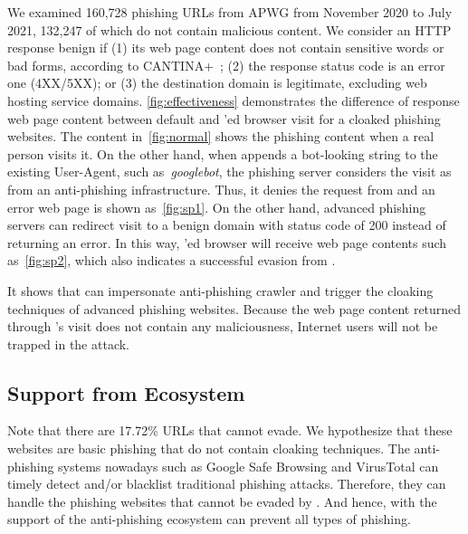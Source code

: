 We examined 160,728 phishing URLs from APWG from November 2020 to July 2021,
132,247 of which do not contain malicious content.
We consider an HTTP response benign if (1) its web page content does not contain sensitive words or bad forms, according to CANTINA+~\cite{xiang2011cantina+};
(2) the response status code is an error one (4XX/5XX);
or (3) the destination domain is legitimate, excluding web hosting service domains.
\autoref{fig:effectiveness} demonstrates the difference of response web page content between default and \spartacus'ed browser visit for a cloaked phishing websites.
The content in~\autoref{fig:normal} shows the phishing content when a real person visits it.
On the other hand, when \spartacus appends a bot-looking string to the existing User-Agent, such as~\emph{googlebot}, the phishing server considers the visit as from an anti-phishing infrastructure.
Thus, it denies the request from \spartacus and an error web page is shown as~\autoref{fig:sp1}.
On the other hand, advanced phishing servers can redirect visit to a benign domain with status code of 200 instead of returning an error.
In this way, \spartacus'ed browser will receive web page contents such as~\autoref{fig:sp2},
which also indicates a successful evasion 
from \spartacus.

It shows that \spartacus can impersonate anti-phishing crawler and trigger the cloaking techniques of advanced phishing websites.
Because the web page content returned through \spartacus's visit does not contain any maliciousness, Internet users will not be trapped in the attack.


\subsection{Support from Ecosystem}

Note that there are 17.72\% URLs that \spartacus cannot evade.
We hypothesize that these websites are basic phishing that do not contain cloaking techniques.
The anti-phishing systems nowadays such as Google Safe Browsing and VirusTotal can timely detect and/or blacklist traditional phishing attacks.
Therefore, they can handle the phishing websites that cannot be evaded by \spartacus.
And hence, \spartacus with the support of the anti-phishing ecosystem can prevent all types of phishing.

